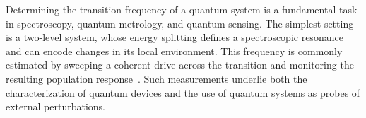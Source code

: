 






Determining the transition frequency of a quantum system is a fundamental task
in spectroscopy, quantum metrology, and quantum sensing. The simplest setting
is a two-level system, whose energy splitting defines a spectroscopic resonance
and can encode changes in its local environment. This frequency is commonly
estimated by sweeping a coherent drive across the transition and monitoring
the resulting population response~\cite{PhysRev.70.460,PhysRev.78.695,PhysRevLett.122.060503,retzker_2}.
Such measurements underlie both the characterization of quantum devices and
the use of quantum systems as probes of external perturbations.

